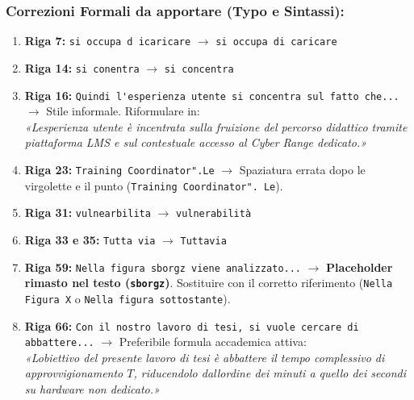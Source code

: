 \subsubsection{Correzioni Formali da apportare (Typo e
Sintassi):}\label{correzioni-formali-da-apportare-typo-e-sintassi}

\begin{enumerate}
\def\labelenumi{\arabic{enumi}.}
\tightlist
\item
  \textbf{Riga 7:} \passthrough{\lstinline!si occupa d icaricare!}
  \(\rightarrow\) \passthrough{\lstinline!si occupa di caricare!}
\item
  \textbf{Riga 14:} \passthrough{\lstinline!si conentra!}
  \(\rightarrow\) \passthrough{\lstinline!si concentra!}
\item
  \textbf{Riga 16:}
  \passthrough{\lstinline!Quindi l'esperienza utente si concentra sul fatto che...!}
  \(\rightarrow\) Stile informale. Riformulare in:\\
  \emph{«L\textquotesingle esperienza utente è incentrata sulla
  fruizione del percorso didattico tramite piattaforma LMS e sul
  contestuale accesso al Cyber Range dedicato.»}
\item
  \textbf{Riga 23:} \passthrough{\lstinline!Training Coordinator".Le!}
  \(\rightarrow\) Spaziatura errata dopo le virgolette e il punto
  (\passthrough{\lstinline!Training Coordinator". Le!}).
\item
  \textbf{Riga 31:} \passthrough{\lstinline!vulnearbilita!}
  \(\rightarrow\) \passthrough{\lstinline!vulnerabilità!}
\item
  \textbf{Riga 33 e 35:} \passthrough{\lstinline!Tutta via!}
  \(\rightarrow\) \passthrough{\lstinline!Tuttavia!}
\item
  \textbf{Riga 59:}
  \passthrough{\lstinline!Nella figura sborgz viene analizzato...!}
  \(\rightarrow\) \textbf{Placeholder rimasto nel testo
  (\passthrough{\lstinline!sborgz!})}. Sostituire con il corretto
  riferimento (\passthrough{\lstinline!Nella Figura X!} o
  \passthrough{\lstinline!Nella figura sottostante!}).
\item
  \textbf{Riga 66:}
  \passthrough{\lstinline!Con il nostro lavoro di tesi, si vuole cercare di abbattere...!}
  \(\rightarrow\) Preferibile formula accademica attiva:\\
  \emph{«L\textquotesingle obiettivo del presente lavoro di tesi è
  abbattere il tempo complessivo di approvvigionamento \(T\),
  riducendolo dall\textquotesingle ordine dei minuti a quello dei
  secondi su hardware non dedicato.»}
\end{enumerate}
